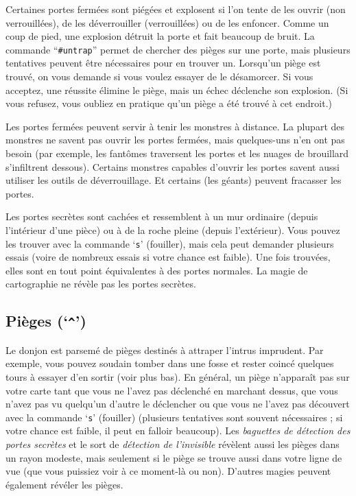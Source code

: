 \documentclass[titlepage]{article}
\begin{document}
Certaines portes fermées sont piégées et explosent si l'on tente
de les ouvrir (non verrouillées), de les déverrouiller (verrouillées) ou de
les enfoncer.
Comme un coup de pied, une explosion détruit la porte et fait beaucoup de bruit.
La commande ``\texttt{\#untrap}'' permet de chercher des pièges sur une porte, mais
plusieurs tentatives peuvent être nécessaires pour en trouver un.
Lorsqu'un piège est trouvé, on vous demande si vous voulez essayer de le désamorcer.
Si vous acceptez, une réussite élimine le piège, mais
un échec déclenche son explosion.
(Si vous refusez, vous oubliez en pratique qu'un piège a été trouvé à cet endroit.)

Les portes fermées peuvent servir à tenir les monstres à distance.
La plupart des monstres ne savent pas ouvrir les portes fermées, mais quelques-uns
n'en ont pas besoin (par exemple, les fantômes traversent les portes et les
nuages de brouillard s'infiltrent dessous).
Certains monstres capables d'ouvrir les portes savent aussi utiliser les outils
de déverrouillage.
Et certains (les géants) peuvent fracasser les portes.

Les portes secrètes sont cachées et ressemblent à un mur ordinaire (depuis
l'intérieur d'une pièce) ou à de la roche pleine (depuis l'extérieur).
Vous pouvez les trouver avec la commande `\texttt{s}' (fouiller), mais cela peut
demander plusieurs essais (voire de nombreux essais si votre chance est faible).
Une fois trouvées, elles sont en tout point équivalentes à des portes normales.
La magie de cartographie ne révèle pas les portes secrètes.

\subsection*{Pièges (`\texttt{\textasciicircum }')}

Le donjon est parsemé de pièges destinés à attraper l'intrus imprudent.
Par exemple, vous pouvez soudain tomber dans une fosse et rester coincé
quelques tours à essayer d'en sortir (voir plus bas).
En général, un piège n'apparaît pas sur votre carte tant que vous ne l'avez pas
déclenché en marchant dessus, que vous n'avez pas vu quelqu'un d'autre le
déclencher ou que vous ne l'avez pas découvert avec
la commande `\texttt{s}' (fouiller) (plusieurs tentatives sont souvent nécessaires ;
si votre chance est faible, il peut en falloir beaucoup).
Les \textit{baguettes de détection des portes secrètes} et le sort de \textit{détection de l'invisible}
révèlent aussi les pièges dans un rayon modeste, mais seulement si le piège se trouve
aussi dans votre ligne de vue (que vous puissiez voir à ce moment-là ou non).
D'autres magies peuvent également révéler les pièges.
\end{document}
